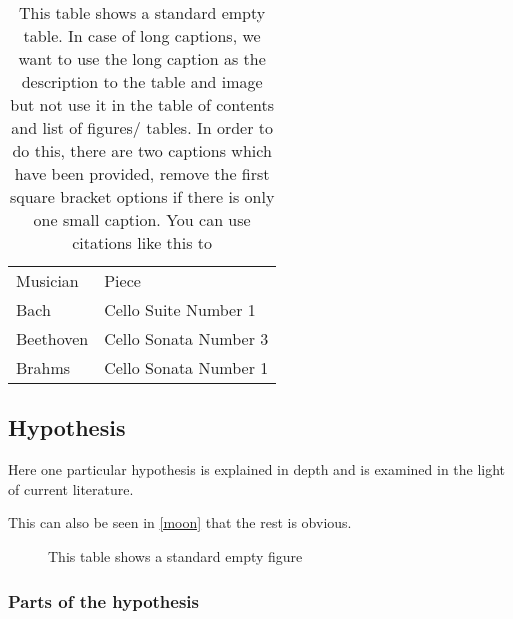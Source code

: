 \begin{table}[h!tb] \centering
    \caption[This table shows a standard non-empty table. Please check the code caption for extended instructions]{This table shows a standard empty table. In case of long captions, we want to use the long caption as the description to the table and image but not use it in the table of contents and list of figures/ tables. In order to do this, there are two captions which have been provided, remove the first square bracket options if there is only one small caption. You can use citations like this to}

    \begin{tabular}{ll}
        Musician  & Piece                 \\
        Bach      & Cello Suite Number 1  \\
        Beethoven & Cello Sonata Number 3 \\
        Brahms    & Cello Sonata Number 1
    \end{tabular}
    \label{nothing}

    \vspace{ 2 in}
\end{table}

\subsection{Hypothesis}

Here one particular hypothesis is explained in depth
and is examined in the light of current literature.

This can also be seen in \autoref{moon} that the
rest is obvious.

\begin{figure}[h!tb] \centering

    \vspace{ 2 in}
    \caption{This table shows a standard empty figure}
    \label{moon}
\end{figure}

\subsubsection{Parts of the hypothesis}

